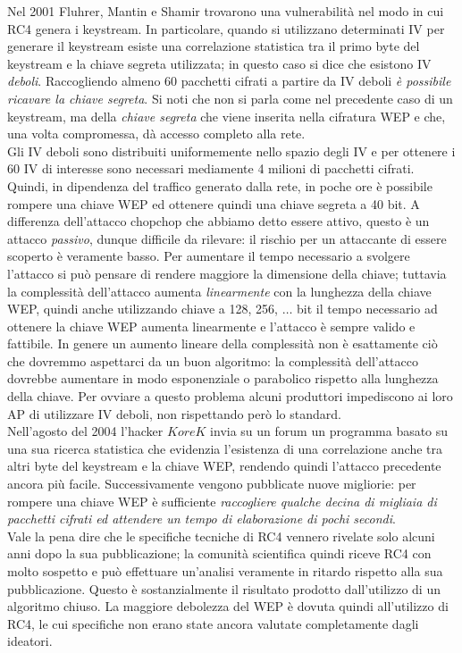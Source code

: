 Nel 2001 Fluhrer, Mantin e Shamir trovarono una vulnerabilità nel modo in cui RC4 genera i keystream. In particolare, quando si utilizzano determinati IV per generare il keystream esiste una correlazione statistica tra il primo byte del keystream e la chiave segreta utilizzata; in questo caso si dice che esistono IV \textit{deboli}. Raccogliendo almeno 60 pacchetti cifrati a partire da IV deboli \textit{è possibile ricavare la chiave segreta}. Si noti che non si parla come nel precedente caso di un keystream, ma della \textit{chiave segreta} che viene inserita nella cifratura WEP e che, una volta compromessa, dà accesso completo alla rete.\\
Gli IV deboli sono distribuiti uniformemente nello spazio degli IV e per ottenere i 60 IV di interesse sono necessari mediamente 4 milioni di pacchetti cifrati. Quindi, in dipendenza del traffico generato dalla rete, in poche ore è possibile rompere una chiave WEP ed ottenere quindi una chiave segreta a 40 bit. A differenza dell'attacco chopchop che abbiamo detto essere attivo, questo è un attacco \textit{passivo}, dunque difficile da rilevare: il rischio per un attaccante di essere scoperto è veramente basso. Per aumentare il tempo necessario a svolgere l'attacco si può pensare di rendere maggiore la dimensione della chiave; tuttavia la complessità dell'attacco aumenta \textit{linearmente} con la lunghezza della chiave WEP, quindi anche utilizzando chiave a 128, 256, $\dots$ bit il tempo necessario ad ottenere la chiave WEP aumenta linearmente e l'attacco è sempre valido e fattibile. In genere un aumento lineare della complessità non è esattamente ciò che dovremmo aspettarci da un buon algoritmo: la complessità dell'attacco dovrebbe aumentare in modo esponenziale o parabolico rispetto alla lunghezza della chiave. Per ovviare a questo problema alcuni produttori impediscono ai loro AP di utilizzare IV deboli, non rispettando però lo standard.\\
Nell'agosto del 2004 l'hacker $KoreK$ invia su un forum un programma basato su una sua ricerca statistica che evidenzia l'esistenza di una correlazione anche tra altri byte del keystream e la chiave WEP, rendendo quindi l'attacco precedente ancora più facile. Successivamente vengono pubblicate nuove migliorie: per rompere una chiave WEP è sufficiente \textit{raccogliere qualche decina di migliaia di pacchetti cifrati ed attendere un tempo di elaborazione di pochi secondi}.\\
Vale la pena dire che le specifiche tecniche di RC4 vennero rivelate solo alcuni anni dopo la sua pubblicazione; la comunità scientifica quindi riceve RC4 con molto sospetto e può effettuare un'analisi veramente in ritardo rispetto alla sua pubblicazione. Questo è sostanzialmente il risultato prodotto dall'utilizzo di un algoritmo chiuso. La maggiore debolezza del WEP è dovuta quindi all'utilizzo di RC4, le cui specifiche non erano state ancora valutate completamente dagli ideatori.

